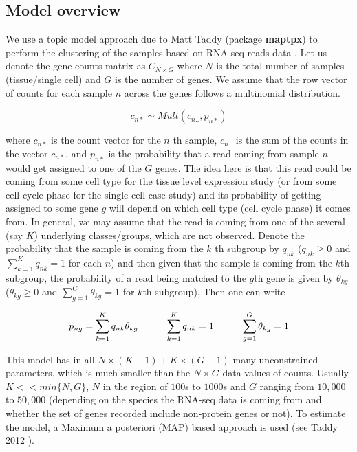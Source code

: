 \subsection{Model overview}

We use a topic model approach due to Matt Taddy (package \textbf{maptpx}) to perform the clustering of the samples based on RNA-seq reads data \cite{Taddy2012}. Let us denote the gene counts matrix as $C_{N \times G}$ where $N$ is the total number of samples (tissue/single cell) and $G$ is the number of genes.  We assume that the row vector of counts for each sample $n$ across the genes follows a multinomial distribution.

$$ c_{n*} \sim Mult(c_{n..}, p_{n*}) $$

where $c_{n*}$ is the count vector for the $n$ th sample, $c_{n..}$ is the sum of the counts in the vector $c_{n*}$, and $p_{n*}$ is the probability that a read coming from sample $n$ would get assigned to one of the $G$ genes. The idea here is that this read could be coming from some cell type for the tissue level expression study (or from some cell cycle phase for the single cell case study) and its probability of getting assigned to some gene $g$ will depend on which cell type (cell cycle phase) it comes from. In general, we may assume that the read is coming from one of the several (say $K$) underlying classes/groups, which are not observed. Denote  the probability that the sample is coming from the $k$ th subgroup by $q_{nk}$ ($q_{nk} \geq 0$ and $\sum_{k=1}^{K} q_{nk} =1$ for each $n$) and then given that the sample is coming from the $k$th subgroup, the probability of a read being matched to the $g$th gene is given by $\theta_{kg}$ ($\theta_{kg} \geq 0$ and $\sum_{g=1}^{G} \theta_{kg} =1$ for $k$th subgroup). Then one can write 

$$ p_{ng} = \sum_{k=1}^{K} q_{nk}\theta_{kg}   \hspace{1 cm}  \sum_{k=1}^{K} q_{nk}=1 \hspace{1 cm} \sum_{g=1}^{G} \theta_{kg}=1 $$

This model has in all $N \times (K-1) + K \times (G-1)$ many unconstrained parameters, which is much smaller than the $N \times G$  data values of counts. Usually $K << min \{N,G \} $, $N$ in the region of $100$s to $1000$s  and $G$ ranging from $10,000$ to $50,000$ (depending on the species the RNA-seq data is coming from and whether the set of genes recorded include non-protein genes or not). To estimate the model, a Maximum a posteriori (MAP) based approach is used (see Taddy 2012 \cite{Taddy2012}).

